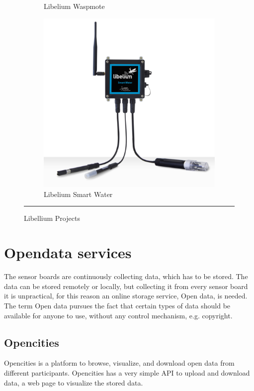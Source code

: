 \documentclass[12pt, a4paper,twoside]{tesi_upf}
\begin{document}
\begin{figure}
\begin{subfigure}[b]{0.3\textwidth}
                \caption{Libelium Waspmote}
                \label{fig:LibeliumWaspmote}
        \end{subfigure}
        \begin{subfigure}[b]{0.3\textwidth}
                \includegraphics[width=\textwidth]{./Figures/LibeliumSmartWater.png}
                \caption{Libelium Smart Water}
                \label{fig:LibeliumSmartWater}
        \end{subfigure}
        \rule{18em}{0.5pt}
        \caption{Libellium Projects}\label{fig:LibelliumProjects}
		\end{figure}

  \section{Opendata services}
    The sensor boards are continuously collecting data, which has to be stored. The data can be stored remotely or locally, but collecting it from every sensor board it is unpractical, for this reason an online storage service, Open data, is needed. The term Open data pursues the fact that certain types of data should be available for anyone to use, without any control mechanism, e.g. copyright.
    
		\subsection{Opencities}
       Opencities \cite{opencities} is a platform to browse, visualize, and download open data from different participants. Opencities has a very simple API to upload and download data, a web page to visualize the stored data.
       
\end{document}
